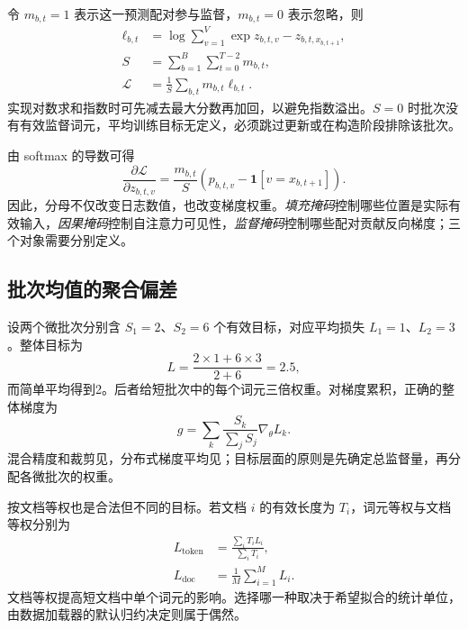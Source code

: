 \documentclass[../textbook.tex]{subfiles}
\begin{document}
令 $m_{b,t}=1$ 表示这一预测配对参与监督，$m_{b,t}=0$ 表示忽略，则
\begin{align}
 \ell_{b,t}&=\log\sum_{v=1}^{V}\exp z_{b,t,v}-z_{b,t,x_{b,t+1}},\\
 S&=\sum_{b=1}^{B}\sum_{t=0}^{T-2}m_{b,t},\nonumber\\
 \mathcal L&=\frac{1}{S}\sum_{b,t}m_{b,t}\ell_{b,t}.
 \label{eq:pt-masked-loss}
\end{align}
实现对数求和指数时可先减去最大分数再加回，以避免指数溢出。$S=0$ 时批次没有有效监督词元，平均训练目标无定义，必须跳过更新或在构造阶段排除该批次。

由 softmax 的导数可得
\begin{equation}
 \frac{\partial\mathcal L}{\partial z_{b,t,v}}
 =\frac{m_{b,t}}{S}\left(p_{b,t,v}-\mathbf1[v=x_{b,t+1}]\right).
 \label{eq:pt-logit-gradient}
\end{equation}
因此，分母不仅改变日志数值，也改变梯度权重。\emph{填充掩码}控制哪些位置是实际有效输入，\emph{因果掩码}控制自注意力可见性，\emph{监督掩码}控制哪些配对贡献反向梯度；三个对象需要分别定义。

\subsection{批次均值的聚合偏差}
设两个微批次分别含 $S_1=2$、$S_2=6$ 个有效目标，对应平均损失 $L_1=1$、$L_2=3$。整体目标为
\begin{equation}
 L=\frac{2\times1+6\times3}{2+6}=2.5,
\end{equation}
而简单平均得到2。后者给短批次中的每个词元三倍权重。对梯度累积，正确的整体梯度为
\begin{equation}
 g=\sum_k\frac{S_k}{\sum_jS_j}\nabla_\theta L_k.
 \label{eq:pt-accum}
\end{equation}
混合精度和裁剪见，分布式梯度平均见；目标层面的原则是先确定总监督量，再分配各微批次的权重。

按文档等权也是合法但不同的目标。若文档 $i$ 的有效长度为 $T_i$，词元等权与文档等权分别为
\begin{equation}
\begin{aligned}
 L_{\mathrm{token}} &= \frac{\sum_iT_iL_i}{\sum_iT_i}, \\
 L_{\mathrm{doc}} &= \frac1M\sum_{i=1}^{M}L_i.
\end{aligned}
\end{equation}
文档等权提高短文档中单个词元的影响。选择哪一种取决于希望拟合的统计单位，由数据加载器的默认归约决定则属于偶然。
\end{document}
